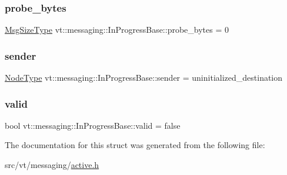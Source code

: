 \subsubsection{\texorpdfstring{probe\+\_\+bytes}{probe\_bytes}}
{\footnotesize\ttfamily \hyperlink{namespacevt_a408e86a8c7c89309b52907dc5a513924}{Msg\+Size\+Type} vt\+::messaging\+::\+In\+Progress\+Base\+::probe\+\_\+bytes = 0}

\mbox{\label{structvt_1_1messaging_1_1_in_progress_base_ad0c153e52ba71c9295a45d73a5d3ccd8}} 
\subsubsection{\texorpdfstring{sender}{sender}}
{\footnotesize\ttfamily \hyperlink{namespacevt_a866da9d0efc19c0a1ce79e9e492f47e2}{Node\+Type} vt\+::messaging\+::\+In\+Progress\+Base\+::sender = uninitialized\+\_\+destination}

\mbox{\label{structvt_1_1messaging_1_1_in_progress_base_a5dce1ae0bdfaa40935023561e0d16671}} 
\subsubsection{\texorpdfstring{valid}{valid}}
{\footnotesize\ttfamily bool vt\+::messaging\+::\+In\+Progress\+Base\+::valid = false}



The documentation for this struct was generated from the following file\+:\begin{DoxyCompactItemize}
\item 
src/vt/messaging/\hyperlink{active_8h}{active.\+h}\end{DoxyCompactItemize}
